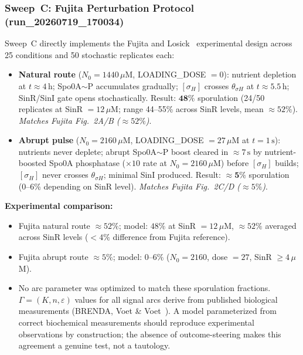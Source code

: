 \documentclass[10pt,letterpaper]{article}
\begin{document}
\subsubsection{Sweep~C: Fujita Perturbation Protocol (run\_20260719\_170034)}

Sweep~C directly implements the Fujita and Losick~\cite{fujita2005} experimental design across 25 conditions and 50 stochastic replicates each:

\begin{itemize}
\item \textbf{Natural route} ($N_0 = 1440\,\mu$M, LOADING\_DOSE $= 0$): nutrient depletion at $t \approx 4\,\text{h}$; Spo0A$\sim$P accumulates gradually; $[\sigma_H]$ crosses $\theta_{\sigma H}$ at $t \approx 5.5\,\text{h}$; SinR/SinI gate opens stochastically. Result: $\mathbf{48\%}$ sporulation (24/50 replicates at SinR $= 12\,\mu$M; range 44--55\% across SinR levels, mean $\approx 52\%$). \emph{Matches Fujita Fig.~2A/B ($\approx 52\%$)}.
\item \textbf{Abrupt pulse} ($N_0 = 2160\,\mu$M, LOADING\_DOSE $= 27\,\mu$M at $t = 1\,\text{s}$): nutrients never deplete; abrupt Spo0A$\sim$P boost cleared in $\approx 7\,\text{s}$ by nutrient-boosted Spo0A phosphatase ($\times 10$ rate at $N_0 = 2160\,\mu$M) before $[\sigma_H]$ builds; $[\sigma_H]$ never crosses $\theta_{\sigma H}$; minimal SinI produced. Result: $\mathbf{\approx 5\%}$ sporulation (0--6\% depending on SinR level). \emph{Matches Fujita Fig.~2C/D ($\approx 5\%$)}.
\end{itemize}

\textbf{Experimental comparison:}
\begin{itemize}
\item Fujita natural route $\approx 52\%$; model: $48\%$ at SinR $= 12\,\mu$M, $\approx 52\%$ averaged across SinR levels ($< 4\%$ difference from Fujita reference).
\item Fujita abrupt route $\approx 5\%$; model: $0\text{--}6\%$ ($N_0 = 2160$, dose $= 27$, SinR $\geq 4\,\mu$M).
\item No arc parameter was optimized to match these sporulation fractions. $\Gamma = (K, n, \varepsilon)$ values for all signal arcs derive from published biological measurements (BRENDA, Voet \& Voet~\cite{voet2016}). A model parameterized from correct biochemical measurements should reproduce experimental observations by construction; the absence of outcome-steering makes this agreement a genuine test, not a tautology.
\end{itemize}
\end{document}
